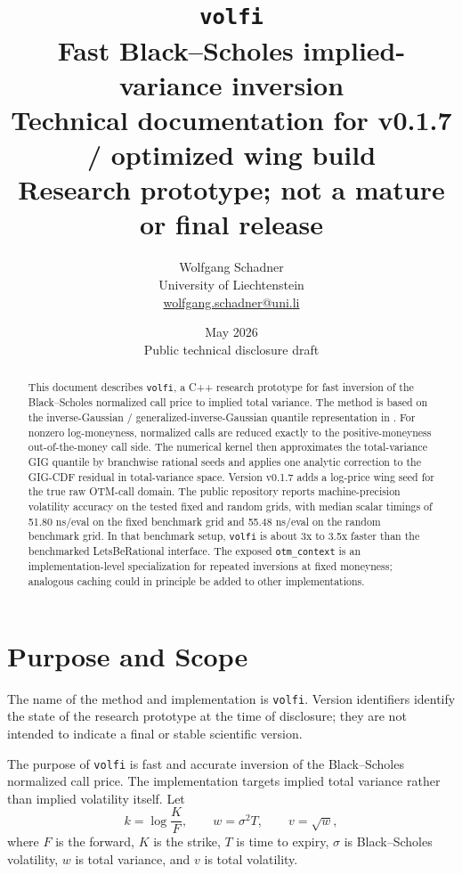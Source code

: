 \documentclass[11pt]{article}
\title{\texttt{volfi}\\[0.35em]\large Fast Black--Scholes implied-variance inversion\\[0.2em]\normalsize Technical documentation for v0.1.7 / optimized wing build\\[0.2em]\small Research prototype; not a mature or final release}
\author{Wolfgang Schadner\\\small University of Liechtenstein\\\small \href{mailto:wolfgang.schadner@uni.li}{wolfgang.schadner@uni.li}}
\date{May 2026\\[0.3em]\small Public technical disclosure draft}
\begin{document}
	\maketitle
	
	\begin{abstract}
		This document describes \texttt{volfi}, a C++ research prototype for fast inversion of the Black--Scholes normalized call price to implied total variance. The method is based on the inverse-Gaussian / generalized-inverse-Gaussian quantile representation in \cite{schadner2026explicit}. For nonzero log-moneyness, normalized calls are reduced exactly to the positive-moneyness out-of-the-money call side. The numerical kernel then approximates the total-variance GIG quantile by branchwise rational seeds and applies one analytic correction to the GIG-CDF residual in total-variance space. Version v0.1.7 adds a log-price wing seed for the true raw OTM-call domain. The public repository reports machine-precision volatility accuracy on the tested fixed and random grids, with median scalar timings of 51.80 ns/eval on the fixed benchmark grid and 55.48 ns/eval on the random benchmark grid. In that benchmark setup, \texttt{volfi} is about 3x to 3.5x faster than the benchmarked LetsBeRational interface. The exposed \texttt{otm\_context} is an implementation-level specialization for repeated inversions at fixed moneyness; analogous caching could in principle be added to other implementations.
	\end{abstract}
	
	\section{Purpose and Scope}
	
	The name of the method and implementation is \texttt{volfi}. Version identifiers identify the state of the research prototype at the time of disclosure; they are not intended to indicate a final or stable scientific version.
	
	The purpose of \texttt{volfi} is fast and accurate inversion of the Black--Scholes normalized call price. The implementation targets implied total variance rather than implied volatility itself. Let
	\begin{equation}
		k = \log\frac{K}{F}, \qquad w = \sigma^2 T, \qquad v=\sqrt{w},
	\end{equation}
	where $F$ is the forward, $K$ is the strike, $T$ is time to expiry, $\sigma$ is Black--Scholes volatility, $w$ is total variance, and $v$ is total volatility.
	
\end{document}

